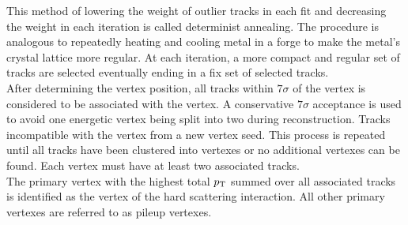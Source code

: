 \indent This method of lowering the weight of outlier tracks in each fit and decreasing the weight in each iteration is called determinist annealing. \cite{adaptiveFitting}  The procedure is analogous to repeatedly heating and cooling metal in a forge to make the metal's crystal lattice more regular.  At each iteration, a more compact and regular set of tracks are selected eventually ending in a fix set of selected tracks.  \\

\indent  After determining the vertex position, all tracks within $7\sigma$ of the vertex is considered to be associated with the vertex.  A conservative $7\sigma$ acceptance is used to avoid one energetic vertex being split into two during reconstruction.  Tracks incompatible with the vertex from a new vertex seed.  This process is repeated until all tracks have been clustered into vertexes or no additional vertexes can be found.  Each vertex must have at least two associated tracks. \\

\indent The primary vertex with the highest total $p_{\mathrm{T}}$ summed over all associated tracks is identified as the vertex of the hard scattering interaction.  All other primary vertexes are referred to as pileup vertexes.
